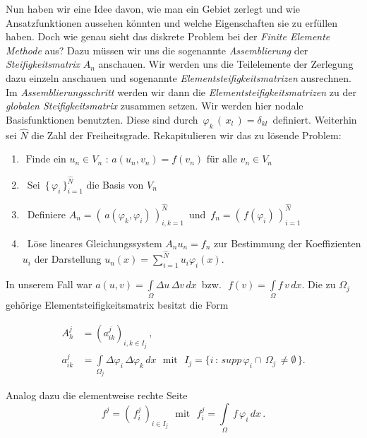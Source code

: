 Nun haben wir eine Idee davon, wie man ein Gebiet zerlegt und wie Ansatzfunktionen aussehen könnten und welche Eigenschaften sie zu erfüllen haben. Doch wie genau sieht das diskrete Problem bei der \textit{Finite Elemente Methode} aus? Dazu müssen wir uns die sogenannte \textit{Assemblierung} der \textit{Steifigkeitsmatrix} $A_n$ anschauen. Wir werden uns die Teilelemente der Zerlegung dazu einzeln anschauen und sogenannte \textit{Elementsteifigkeitsmatrizen} ausrechnen. Im \textit{Assemblierungsschritt} werden wir dann die  \textit{Elementsteifigkeitsmatrizen} zu der \textit{globalen Steifigkeitsmatrix} zusammen setzen.
Wir werden hier nodale Basisfunktionen benutzten. Diese sind durch $\, \varphi_k \, ( \, x_l \, ) = \delta_{kl} \,$ definiert. Weiterhin sei $\hat{N}$ die Zahl der Freiheitsgrade. Rekapitulieren wir das zu lösende Problem:

\begin{framed}
\begin{enumerate}
\item $
\text{ Finde ein } u_n \in V_n \text{ : } a(u_n,v_n) = f(v_n) \text{ für alle } v_n \in V_n
$
\item ~Sei $\, \{ \, \varphi_i \, \}_{i=1}^{\hat{N}}$ die Basis  von $V_n$
\item ~Definiere $A_n=( \, a(\varphi_k,\varphi_i) \, )_{i,k=1}^{\hat{N}} \, $ und $ \, f_n=( \, f(\varphi_i) \, )_{i=1}^{\hat{N}}$
\item ~Löse lineares Gleichungssystem $A_n u_n=f_n$ zur Bestimmung der Koeffizienten $u_i$ der Darstellung $u_n(x)=\sum_{i=1}^{\hat{N}} u_i \varphi_i(x)$.
\end{enumerate}
\end{framed}

In unserem Fall war $a(u,v)=\int\limits_{\Omega} \Delta u \, \Delta v \, dx \, $ bzw. $\, \, f(v)=\int\limits_{\Omega} f \, v \, dx$. Die zu $\Omega_j$ gehörige Elementsteifigkeitsmatrix besitzt die Form

\begin{equation} \label{eq:element}
\begin{aligned}
A_h^j &= (a_{ik}^j)_{i,k \in I_j} \, ,\\
a_{ik}^j &= \int\limits_{\Omega_j} \Delta \varphi_i \, \Delta \varphi_k \, dx \, \, \text{ mit } \, \, 
I_j =\{ i \, : \, supp \, \varphi_i \cap \, \Omega_j \, \neq \emptyset \, \} .
\end{aligned}
\end{equation}

Analog dazu die elementweise rechte Seite
\begin{equation*}
f^j = (\, f_i^j \, )_{i \in I_j} \, \, \text{ mit } \, \, f_i^j = \int\limits_{\Omega} \, f \, \varphi_i \, dx  \, .
\end{equation*}

